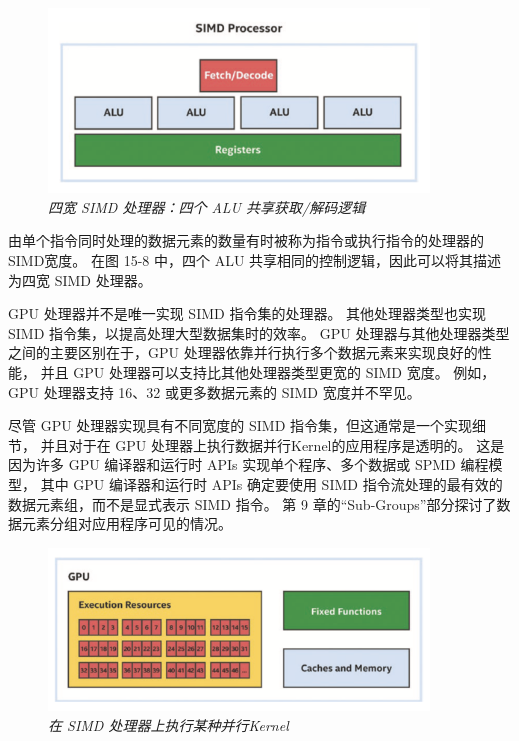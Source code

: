 \begin{figure}[H]
	\centering
	\includegraphics[width=0.9\textwidth]{figs/F15.8.png}
	\caption{\textit{四宽 SIMD 处理器：四个 ALU 共享获取/解码逻辑 }}
\end{figure}

由单个指令同时处理的数据元素的数量有时被称为指令或执行指令的处理器的SIMD宽度。 
在图 15-8 中，四个 ALU 共享相同的控制逻辑，因此可以将其描述为四宽 SIMD 处理器。

GPU 处理器并不是唯一实现 SIMD 指令集的处理器。 
其他处理器类型也实现 SIMD 指令集，以提高处理大型数据集时的效率。 
GPU 处理器与其他处理器类型之间的主要区别在于，GPU 处理器依靠并行执行多个数据元素来实现良好的性能，
并且 GPU 处理器可以支持比其他处理器类型更宽的 SIMD 宽度。 
例如，GPU 处理器支持 16、32 或更多数据元素的 SIMD 宽度并不罕见。

\begin{remark}
尽管 GPU 处理器实现具有不同宽度的 SIMD 指令集，但这通常是一个实现细节，
并且对于在 GPU 处理器上执行数据并行Kernel的应用程序是透明的。
这是因为许多 GPU 编译器和运行时 APIs 实现单个程序、多个数据或 SPMD 编程模型，
其中 GPU 编译器和运行时 APIs 确定要使用 SIMD 指令流处理的最有效的数据元素组，而不是显式表示 SIMD 指令。
第 9 章的“Sub-Groups”部分探讨了数据元素分组对应用程序可见的情况。
\end{remark}

\begin{figure}[H]
	\centering
	\includegraphics[width=0.9\textwidth]{figs/F15.9.png}
	\caption{\textit{在 SIMD 处理器上执行某种并行Kernel }}
\end{figure}

